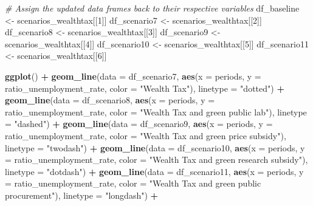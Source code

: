 \documentclass[
]{article}
\newenvironment{Shaded}{\begin{snugshade}}{\end{snugshade}}
\newcommand{\AttributeTok}[1]{\textcolor[rgb]{0.13,0.29,0.53}{#1}}
\newcommand{\CommentTok}[1]{\textcolor[rgb]{0.56,0.35,0.01}{\textit{#1}}}
\newcommand{\DecValTok}[1]{\textcolor[rgb]{0.00,0.00,0.81}{#1}}
\newcommand{\FunctionTok}[1]{\textcolor[rgb]{0.13,0.29,0.53}{\textbf{#1}}}
\newcommand{\NormalTok}[1]{#1}
\newcommand{\OtherTok}[1]{\textcolor[rgb]{0.56,0.35,0.01}{#1}}
\newcommand{\SpecialCharTok}[1]{\textcolor[rgb]{0.81,0.36,0.00}{\textbf{#1}}}
\newcommand{\StringTok}[1]{\textcolor[rgb]{0.31,0.60,0.02}{#1}}
\begin{document}
\begin{Shaded}
\begin{Highlighting}[]
\CommentTok{\# Assign the updated data frames back to their respective variables}
\NormalTok{df\_baseline }\OtherTok{\textless{}{-}}\NormalTok{ scenarios\_wealthtax[[}\DecValTok{1}\NormalTok{]]}
\NormalTok{df\_scenario7 }\OtherTok{\textless{}{-}}\NormalTok{ scenarios\_wealthtax[[}\DecValTok{2}\NormalTok{]]}
\NormalTok{df\_scenario8 }\OtherTok{\textless{}{-}}\NormalTok{ scenarios\_wealthtax[[}\DecValTok{3}\NormalTok{]]}
\NormalTok{df\_scenario9 }\OtherTok{\textless{}{-}}\NormalTok{ scenarios\_wealthtax[[}\DecValTok{4}\NormalTok{]]}
\NormalTok{df\_scenario10 }\OtherTok{\textless{}{-}}\NormalTok{ scenarios\_wealthtax[[}\DecValTok{5}\NormalTok{]]}
\NormalTok{df\_scenario11 }\OtherTok{\textless{}{-}}\NormalTok{ scenarios\_wealthtax[[}\DecValTok{6}\NormalTok{]]}


\FunctionTok{ggplot}\NormalTok{() }\SpecialCharTok{+}
  \FunctionTok{geom\_line}\NormalTok{(}\AttributeTok{data =}\NormalTok{ df\_scenario7, }\FunctionTok{aes}\NormalTok{(}\AttributeTok{x =}\NormalTok{ periods, }\AttributeTok{y =}\NormalTok{ ratio\_unemployment\_rate, }\AttributeTok{color =} \StringTok{"Wealth Tax"}\NormalTok{), }\AttributeTok{linetype =} \StringTok{"dotted"}\NormalTok{) }\SpecialCharTok{+}
  \FunctionTok{geom\_line}\NormalTok{(}\AttributeTok{data =}\NormalTok{ df\_scenario8, }\FunctionTok{aes}\NormalTok{(}\AttributeTok{x =}\NormalTok{ periods, }\AttributeTok{y =}\NormalTok{ ratio\_unemployment\_rate, }\AttributeTok{color =} \StringTok{"Wealth Tax and green public lab"}\NormalTok{), }\AttributeTok{linetype =} \StringTok{"dashed"}\NormalTok{) }\SpecialCharTok{+}
  \FunctionTok{geom\_line}\NormalTok{(}\AttributeTok{data =}\NormalTok{ df\_scenario9, }\FunctionTok{aes}\NormalTok{(}\AttributeTok{x =}\NormalTok{ periods, }\AttributeTok{y =}\NormalTok{ ratio\_unemployment\_rate, }\AttributeTok{color =} \StringTok{"Wealth Tax and green price subsidy"}\NormalTok{), }\AttributeTok{linetype =} \StringTok{"twodash"}\NormalTok{) }\SpecialCharTok{+}
  \FunctionTok{geom\_line}\NormalTok{(}\AttributeTok{data =}\NormalTok{ df\_scenario10, }\FunctionTok{aes}\NormalTok{(}\AttributeTok{x =}\NormalTok{ periods, }\AttributeTok{y =}\NormalTok{ ratio\_unemployment\_rate, }\AttributeTok{color =} \StringTok{"Wealth Tax and green research subsidy"}\NormalTok{), }\AttributeTok{linetype =} \StringTok{"dotdash"}\NormalTok{) }\SpecialCharTok{+}
  \FunctionTok{geom\_line}\NormalTok{(}\AttributeTok{data =}\NormalTok{ df\_scenario11, }\FunctionTok{aes}\NormalTok{(}\AttributeTok{x =}\NormalTok{ periods, }\AttributeTok{y =}\NormalTok{ ratio\_unemployment\_rate, }\AttributeTok{color =} \StringTok{"Wealth Tax and green public procurement"}\NormalTok{), }\AttributeTok{linetype =} \StringTok{"longdash"}\NormalTok{) }\SpecialCharTok{+}

\end{Highlighting}
\end{Shaded}
\end{document}
